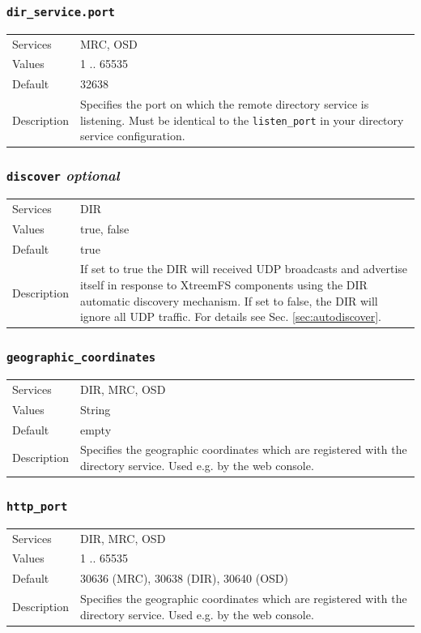 \documentclass[a4paper,10pt]{book}
\begin{document}
\subsubsection{\texttt{dir\_service.port}}
\begin{tabular}{lp{10cm}}
 Services & MRC, OSD\\
 Values   & 1 .. 65535 \\
 Default  & 32638 \\
 Description & Specifies the port on which the remote directory service is listening. Must be identical to the \texttt{listen\_port} in your directory service configuration.
\end{tabular}

\subsubsection{\texttt{discover} \textit{optional}}
\begin{tabular}{lp{10cm}}
 Services & DIR\\
 Values   & true, false \\
 Default  & true \\
 Description & If set to true the DIR will received UDP broadcasts and advertise itself in response to XtreemFS components using the DIR automatic discovery mechanism. If set to false, the DIR will ignore all UDP traffic. For details see Sec. \ref{sec:autodiscover}.
\end{tabular}

\subsubsection{\texttt{geographic\_coordinates}}
\begin{tabular}{lp{10cm}}
 Services & DIR, MRC, OSD\\
 Values   & String \\
 Default  & empty \\
 Description & Specifies the geographic coordinates which are registered with the directory service. Used e.g. by the web console.
\end{tabular}

\subsubsection{\texttt{http\_port}}
\begin{tabular}{lp{10cm}}
 Services & DIR, MRC, OSD\\
 Values   & 1 .. 65535 \\
 Default  & 30636 (MRC), 30638 (DIR), 30640 (OSD)\\
 Description & Specifies the geographic coordinates which are registered with the directory service. Used e.g. by the web console.
\end{tabular}
\end{document}
